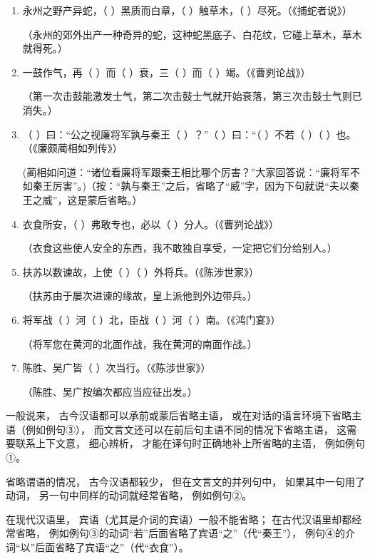 \noindent
\begin{enumerate}[label=\textcircled{\arabic*}]
	\item 永州之野产异蛇，（ ）黑质而白章，（ ）触草木，（ ）尽死。（《捕蛇者说》）
	
	（永州的郊外出产一种奇异的蛇，这种蛇黑底子、白花纹，它碰上草木，草木就得死。）
	
	\item 一鼓作气，再（ ）而（ ）衰，三（ ）而（ ）竭。（《曹刿论战》）
	
	（第一次击鼓能激发士气，第二次击鼓士气就开始衰落，第三次击鼓士气则已消失。）
	
	\item （ ）曰：“公之视廉将军孰与秦王（ ）？”（ ）曰：“（ ）不若（ ）（ ）也。（《廉颇蔺相如列传》）
	
	(蔺相如问道：“诸位看廉将军跟秦王相比哪个厉害？”大家回答说：“廉将军不如秦王厉害”。)（按：“孰与秦王”之后，省略了“威”字，因为下句就说“夫以秦王之威”，这是蒙后省略。）
	
	\item 衣食所安，（ ）弗敢专也，必以（ ）分人。（《曹刿论战》）
	
	（衣食这些使人安全的东西，我不敢独自享受，一定把它们分给别人。）
	
	\item 扶苏以数谏故，上使（ ）（ ）外将兵。（《陈涉世家》）
	
	（扶苏由于屡次进谏的缘故，皇上派他到外边带兵。）
	
	\item 将军战（ ）河（ ）北，臣战（ ）河（ ）南。（《鸿门宴》）
	
	（将军您在黄河的北面作战，我在黄河的南面作战。）
	
	\item 陈胜、吴广皆（ ）次当行。（《陈涉世家》）
	
    （陈胜、吴广按编次都应当应征出发。）
\end{enumerate}

一般说来，
古今汉语都可以承前或蒙后省略主语，
或在对话的语言环境下省略主语（例如例句③），
而文言文还可以在前后句主语不同的情况下省略主语，
这需要联系上下文意，
细心辨析，
才能在译句时正确地补上所省略的主语，
例如例句①。

省略谓语的情况，
古今汉语都较少，
但在文言文的并列句中，
如果其中一句用了动词，
另一句中同样的动词就经常省略，
例如例句②。

在现代汉语里，
宾语（尤其是介词的宾语）一般不能省略；
在古代汉语里却都经常省略，
例如例句③的动词“若”后面省略了宾语“之”（代“秦王”），
例句④的介词“以”后面省略了宾语“之”（代“衣食”）。

